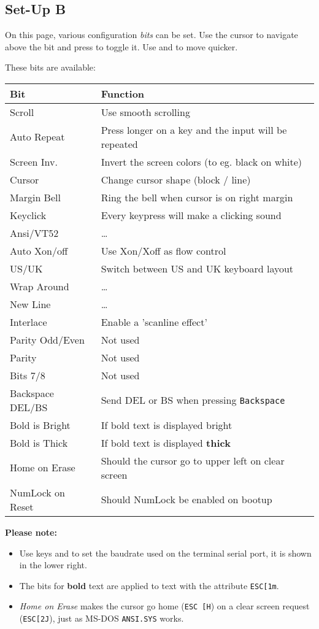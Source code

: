 \subsection{Set-Up B}

On this page, various configuration \textit{bits} can be set. Use the cursor to navigate above the bit and press  to toggle it. Use \LKeyTab{} and \LKeyEnter{} to move quicker.

These bits are available:

\begin{tabular}{p{8em} | p{}}
\hline
\textbf{Bit}	& \textbf{Function} \\
\hline
Scroll			& Use smooth scrolling \\
Auto Repeat		& Press longer on a key and the input will be repeated \\
Screen Inv.		& Invert the screen colors (to eg. black on white) \\
Cursor			& Change cursor shape (block / line) \\
\hline
Margin Bell		& Ring the bell when cursor is on right margin \\
Keyclick		& Every keypress will make a clicking sound \\
Ansi/VT52		& \dots \\
Auto Xon/off	& Use Xon/Xoff as flow control \\
\hline
US/UK			& Switch between US and UK keyboard layout \\
Wrap Around		& \dots \\
New Line		& \dots \\
Interlace		& Enable a 'scanline effect' \\
\hline
Parity Odd/Even	& Not used \\
Parity			& Not used \\
Bits 7/8		& Not used \\
Backspace DEL/BS	& Send DEL or BS when pressing \texttt{Backspace} \\
\hline
Bold is Bright	& If bold text is displayed bright \\
Bold is Thick	& If bold text is displayed \textbf{thick} \\
Home on Erase	& Should the cursor go to upper left on clear screen \\
NumLock on Reset	& Should NumLock be enabled on bootup \\
\hline
\end{tabular}

\newpage
\textbf{Please note:}
\begin{itemize}
 \item Use keys  and  to set the baudrate used on the terminal serial port, it is shown in the lower right.
 \item The bits for \textbf{bold} text are applied to text with the attribute \texttt{ESC[1m}.
 \item \textit{Home on Erase} makes the cursor go home (\texttt{ESC [H}) on a clear screen request (\texttt{ESC[2J}), just as MS-DOS \texttt{ANSI.SYS} works.
\end{itemize}

